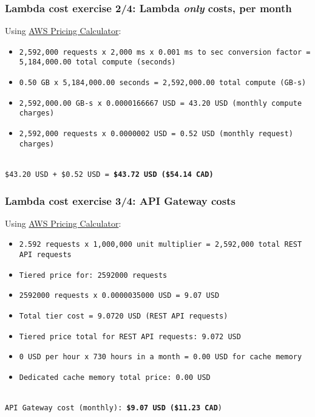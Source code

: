 \documentclass[11pt,aspectratio=169]{beamer}
\begin{document}
\begin{nrcanFrame}
  \frametitle{Lambda cost exercise 2/4: Lambda \textit{only} costs, per month}
  Using
  \href{https://calculator.aws/\#/createCalculator/Lambda}
       {AWS Pricing Calculator}:
  \ \\
      {\footnotesize
        \begin{itemize}
        \item \texttt{2,592,000 requests x 2,000 ms x 0.001 ms to sec conversion factor = 5,184,000.00 total compute (seconds)}
        \item \texttt{0.50 GB x 5,184,000.00 seconds = 2,592,000.00 total compute (GB-s)}
        \item \texttt{2,592,000.00 GB-s x 0.0000166667 USD = 43.20 USD (monthly compute charges)}
        \item \texttt{2,592,000 requests x 0.0000002 USD = 0.52 USD (monthly request) charges)}
        \end{itemize}
        }
            \ \\
      \texttt{\$43.20 USD + \$0.52 USD = \textbf{\$43.72 USD (\$54.14 CAD)}}

\end{nrcanFrame}



\begin{nrcanFrame}
  \frametitle{Lambda cost exercise 3/4: API Gateway costs}
  Using
  \href{https://calculator.aws/\#/createCalculator/APIGateway}{AWS
    Pricing Calculator}:
  \ \\ \vspace{1mm}
        {\footnotesize 
            \begin{itemize}
            \item
              \texttt{2.592 requests x 1,000,000 unit multiplier = 2,592,000 total REST API requests}
            \item
              \texttt{Tiered price for: 2592000 requests}
            \item \texttt{2592000 requests x 0.0000035000 USD = 9.07 USD}
            \item \texttt{Total tier cost = 9.0720 USD (REST API requests)}
            \item \texttt{Tiered price total for REST API requests: 9.072 USD}
            \item \texttt{0 USD per hour x 730 hours in a month = 0.00 USD for cache memory}
            \item \texttt{Dedicated cache memory total price: 0.00 USD}
            \end{itemize}
            }
    \ \\
    \texttt{API Gateway cost (monthly): \textbf{\$9.07 USD (\$11.23 CAD})}\\

\end{nrcanFrame}
\end{document}
